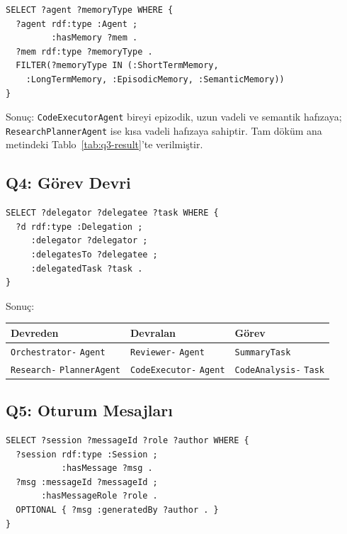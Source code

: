 \documentclass[10pt, a4paper, twocolumn]{article}
\begin{document}
\begin{lstlisting}[language=sparql]
SELECT ?agent ?memoryType WHERE {
  ?agent rdf:type :Agent ;
         :hasMemory ?mem .
  ?mem rdf:type ?memoryType .
  FILTER(?memoryType IN (:ShortTermMemory,
    :LongTermMemory, :EpisodicMemory, :SemanticMemory))
}
\end{lstlisting}

\noindent Sonuç: \texttt{CodeExecutorAgent} bireyi epizodik, uzun vadeli ve semantik hafızaya; \texttt{ResearchPlannerAgent} ise kısa vadeli hafızaya sahiptir. Tam döküm ana metindeki Tablo~\ref{tab:q3-result}'te verilmiştir.

\subsection*{Q4: Görev Devri}

\begin{lstlisting}[language=sparql]
SELECT ?delegator ?delegatee ?task WHERE {
  ?d rdf:type :Delegation ;
     :delegator ?delegator ;
     :delegatesTo ?delegatee ;
     :delegatedTask ?task .
}
\end{lstlisting}

\noindent Sonuç:

\begin{center}
\scriptsize
\begin{tabular}{|p{2cm}|p{2cm}|p{2cm}|}
\hline
\textbf{Devreden} & \textbf{Devralan} & \textbf{Görev} \\
\hline
\texttt{Orchestrator-} \texttt{Agent} & \texttt{Reviewer-} \texttt{Agent} & \texttt{SummaryTask} \\
\hline
\texttt{Research-} \texttt{PlannerAgent} & \texttt{CodeExecutor-} \texttt{Agent} & \texttt{CodeAnalysis-} \texttt{Task} \\
\hline
\end{tabular}
\label{tab:q4-result}
\end{center}

\subsection*{Q5: Oturum Mesajları}

\begin{lstlisting}[language=sparql]
SELECT ?session ?messageId ?role ?author WHERE {
  ?session rdf:type :Session ;
           :hasMessage ?msg .
  ?msg :messageId ?messageId ;
       :hasMessageRole ?role .
  OPTIONAL { ?msg :generatedBy ?author . }
}
\end{lstlisting}
\end{document}

